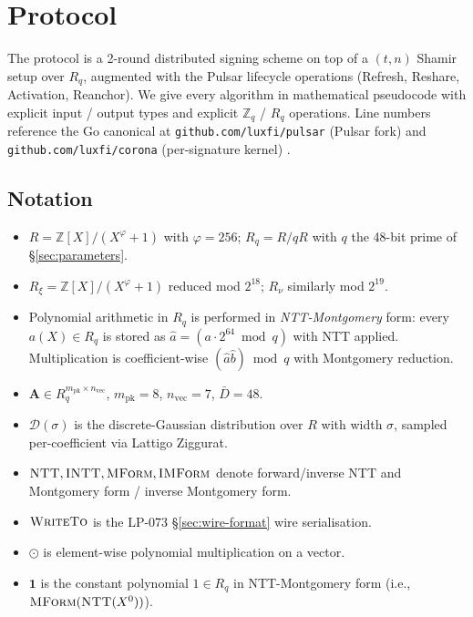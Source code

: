 \section{Protocol}
\label{sec:protocol}

The protocol is a 2-round distributed signing scheme on top of a
$(t, n)$ Shamir setup over $R_q$, augmented with the Pulsar lifecycle
operations (Refresh, Reshare, Activation, Reanchor). We give every
algorithm in mathematical pseudocode with explicit input / output types
and explicit $\mathbb{Z}_q$ / $R_q$ operations. Line numbers reference
the Go canonical at \texttt{github.com/luxfi/pulsar} (Pulsar fork) and
\texttt{github.com/luxfi/corona} (per-signature kernel)
\cite{pulsar,corona}.

\subsection{Notation}
\label{sec:protocol:notation}

\begin{itemize}[nosep]
  \item $R = \mathbb{Z}[X] / (X^{\varphi} + 1)$ with $\varphi = 256$;
        $R_q = R / qR$ with $q$ the 48-bit prime of \S\ref{sec:parameters}.
  \item $R_\xi = \mathbb{Z}[X] / (X^{\varphi} + 1)$ reduced mod $2^{18}$;
        $R_\nu$ similarly mod $2^{19}$.
  \item Polynomial arithmetic in $R_q$ is performed in
        \emph{NTT-Montgomery} form: every $a(X) \in R_q$ is stored as
        $\hat a = (a \cdot 2^{64} \bmod q)$ with NTT applied.
        Multiplication is coefficient-wise $(\hat a \hat b) \bmod q$
        with Montgomery reduction.
  \item $\mathbf{A} \in R_q^{m_{\mathrm{pk}} \times n_{\mathrm{vec}}}$,
        $m_{\mathrm{pk}} = 8$, $n_{\mathrm{vec}} = 7$, $\bar D = 48$.
  \item $\mathcal{D}(\sigma)$ is the discrete-Gaussian distribution
        over $R$ with width $\sigma$, sampled per-coefficient via
        Lattigo Ziggurat.
  \item $\textsc{NTT}, \textsc{INTT}, \textsc{MForm}, \textsc{IMForm}$
        denote forward/inverse NTT and Montgomery form / inverse
        Montgomery form.
  \item $\textsc{WriteTo}$ is the LP-073 \S\ref{sec:wire-format} wire
        serialisation.
  \item $\odot$ is element-wise polynomial multiplication on a vector.
  \item $\mathbf{1}$ is the constant polynomial $1 \in R_q$ in
        NTT-Montgomery form (i.e., $\textsc{MForm}(\textsc{NTT}(X^0))$).
\end{itemize}

